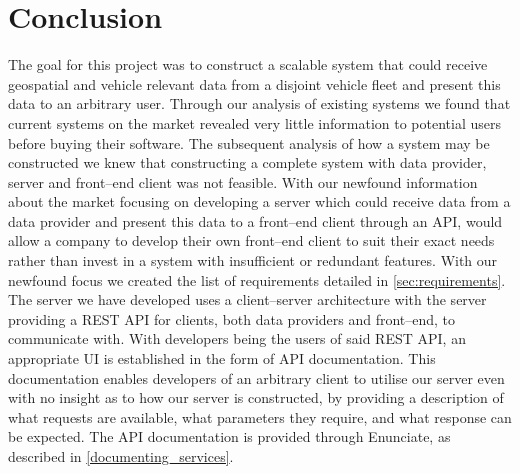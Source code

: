 \chapter{Conclusion}
The goal for this project was to construct a scalable system that could receive geospatial and vehicle relevant data from a disjoint vehicle fleet and present this data to an arbitrary user.
Through our analysis of existing systems we found that current systems on the market revealed very little information to potential users before buying their software.
The subsequent analysis of how a system may be constructed we knew that constructing a complete system with data provider, server and front--end client was not feasible.
With our newfound information about the market focusing on developing a server which could receive data from a data provider and present this data to a front--end client through an API, would allow a company to develop their own front--end client to suit their exact needs rather than invest in a system with insufficient or redundant features.
With our newfound focus we created the list of requirements detailed in \cref{sec:requirements}.
The server we have developed uses a client--server architecture with the server providing a REST API for clients, both data providers and front--end, to communicate with.
With developers being the users of said REST API, an appropriate UI is established in the form of API documentation.
This documentation enables developers of an arbitrary client to utilise our server even with no insight as to how our server is constructed, by providing a description of what requests are available, what parameters they require, and what response can be expected. 
The API documentation is provided through Enunciate, as described in \cref{documenting_services}.

